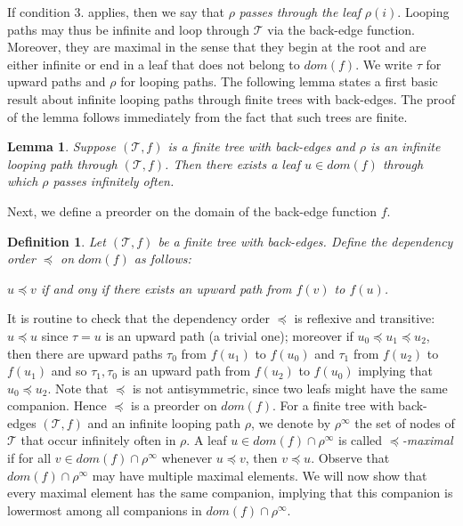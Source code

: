 \documentclass{myifcolog}
\newtheorem{definition}[theorem]{Definition}
\newtheorem{lemma}[theorem]{Lemma}
\numberwithin{theorem}{section}
\begin{document}
	   If condition 3. applies, then we say that $\rho$ \emph{passes through the leaf} $\rho(i)$. Looping paths may thus be infinite and loop through $\mathcal{T}$ via the back-edge function. Moreover, they are maximal in the sense that they begin at the root and are either infinite or end in a leaf that does not belong to $dom(f)$. We write $\tau$ for upward paths and $\rho$ for looping paths. The following lemma states a first basic result about infinite looping paths through finite trees with back-edges. The proof of the lemma follows immediately from the fact that such trees are finite.
	   
	  
	  \begin{lemma}\label{l: infinite path passes through leaf}
	      Suppose $(\mathcal{T},f)$ is a finite tree with back-edges and $\rho$ is an infinite looping path through $(\mathcal{T},f)$. Then there exists a leaf $u \in dom(f)$ through which $\rho$ passes infinitely often.
	  \end{lemma}
	  
      
      Next, we define a preorder on the domain of the back-edge function $f$. 
      
      
      \begin{definition}
          Let $(\mathcal{T},f)$ be a finite tree with back-edges. Define the \emph{dependency order} $\preceq$ on $dom(f)$ as follows:
          \begin{center}
              $u \preceq v$ if and ony if there exists an upward path from $f(v)$ to $f(u)$.
          \end{center}
      \end{definition}
      
      It is routine to check that the dependency order $\preceq$ is reflexive and transitive: $u \preceq u$ since $\tau = u$ is an upward path (a trivial one); moreover if $u_0 \preceq u_1 \preceq u_2$, then there are upward paths $\tau_0$ from $f(u_1)$ to $f(u_0)$ and $\tau_1$ from $f(u_2)$ to $f(u_1)$ and so $\tau_1, \tau_0$ is an upward path from $f(u_2)$ to $f(u_0)$ implying that $u_0 \preceq u_2$. Note that $\preceq$ is not antisymmetric, since two leafs might have the same companion. Hence $\preceq$ is a preorder on $dom(f)$. For a finite tree with back-edges $(\mathcal{T}, f)$ and an infinite looping path $\rho$, we denote by $\rho^{\infty}$ the set of nodes of $\mathcal{T}$ that occur infinitely often in $\rho$. A leaf $u \in dom(f) \cap \rho^\infty$ is called \emph{$\preceq$-maximal} if for all $v \in dom(f) \cap \rho^\infty$ whenever $u \preceq v$, then $v \preceq u$. Observe that $dom(f) \cap \rho^\infty$ may have multiple maximal elements. We will now show that every maximal element has the same companion, implying that this companion is lowermost among all companions in $dom(f) \cap \rho^\infty$.
      
\end{document}
